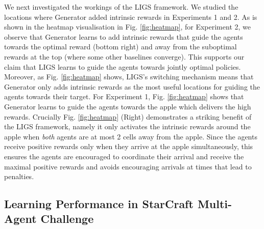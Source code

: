 \documentclass{article}
\begin{document}
We next investigated the workings of the LIGS framework. We studied the locations where {\selectfont Generator} added intrinsic rewards in Experiments 1 and 2. As is shown in the heatmap visualisation in Fig. \ref{fig:heatmap}, for Experiment 2, we observe that {\selectfont Generator} learns to add intrinsic rewards that guide the agents towards the optimal reward (bottom right) and away from the suboptimal rewards at the top (where some other baselines converge). This supports our claim that LIGS learns to guide the agents towards jointly optimal policies. Moreover, as Fig. \ref{fig:heatmap} shows, LIGS's switching mechanism means that {\selectfont Generator} only adds intrinsic rewards as the most useful locations for guiding the agents towards their target. For Experiment 1, Fig. \ref{fig:heatmap} shows that {\selectfont Generator} learns to guide the agents towards the apple which delivers the high rewards. Crucially Fig. \ref{fig:heatmap} (Right) demonstrates a striking benefit of the LIGS framework, namely it only activates the intrinsic rewards around the apple when \textit{both} agents are at most 2 cells away from the apple. Since the agents receive positive rewards only when they arrive at the apple simultaneously, this ensures the agents are encouraged to coordinate their arrival and receive the maximal positive rewards and avoids encouraging arrivals at times that lead to penalties.    
\subsection{Learning Performance in StarCraft Multi-Agent Challenge}
\end{document}
